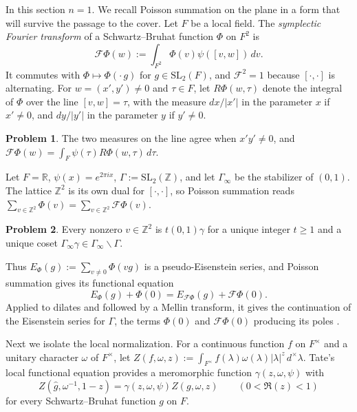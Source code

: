 \documentclass[reqno]{amsart}
\newcommand{\SL}{\mathrm{SL}_2}
\newcommand{\Fc}{\mathcal{F}}
\numberwithin{equation}{section}
\theoremstyle{definition}
\newtheorem{problem}{Problem}[section]
\theoremstyle{plain}
\begin{document}
In this section $n = 1$.  We recall Poisson summation on the plane in a form that will survive the passage to the cover.  Let $F$ be a local field.  The \emph{symplectic Fourier transform} of a Schwartz--Bruhat function $\Phi$ on $F^2$ is
\begin{equation*}
  \Fc \Phi(w) := \int_{F^2} \Phi(v) \psi([v, w]) \, d v.
\end{equation*}
It commutes with $\Phi \mapsto \Phi(\cdot \, g)$ for $g \in \SL(F)$, and $\Fc^2 = 1$ because $[\cdot, \cdot]$ is alternating.  For $w = (x', y') \neq 0$ and $\tau \in F$, let $R \Phi(w, \tau)$ denote the integral of $\Phi$ over the line $[v, w] = \tau$, with the measure $d x / \lvert x' \rvert$ in the parameter $x$ if $x' \neq 0$, and $d y / \lvert y' \rvert$ in the parameter $y$ if $y' \neq 0$.

\begin{problem}\label{pr:lin-lines}
  The two measures on the line agree when $x' y' \neq 0$, and $\Fc \Phi(w) = \int_F \psi(\tau) R \Phi(w, \tau) \, d \tau$.
\end{problem}

Let $F = \mathbb{R}$, $\psi(x) = e^{2 \pi i x}$, $\Gamma := \SL(\mathbb{Z})$, and let $\Gamma_\infty$ be the stabilizer of $(0, 1)$.  The lattice $\mathbb{Z}^2$ is its own dual for $[\cdot, \cdot]$, so Poisson summation reads $\sum_{v \in \mathbb{Z}^2} \Phi(v) = \sum_{v \in \mathbb{Z}^2} \Fc \Phi(v)$.

\begin{problem}\label{pr:lin-eisenstein}
  Every nonzero $v \in \mathbb{Z}^2$ is $t (0, 1) \gamma$ for a unique integer $t \geq 1$ and a unique coset $\Gamma_\infty \gamma \in \Gamma_\infty \backslash \Gamma$.
\end{problem}

Thus $E_\Phi(g) := \sum_{v \neq 0} \Phi(v g)$ is a pseudo-Eisenstein series, and Poisson summation gives its functional equation
\begin{equation}\label{eq:lin-eisenstein}
  E_\Phi(g) + \Phi(0) = E_{\Fc \Phi}(g) + \Fc \Phi(0).
\end{equation}
Applied to dilates and followed by a Mellin transform, it gives the continuation of the Eisenstein series for $\Gamma$, the terms $\Phi(0)$ and $\Fc \Phi(0)$ producing its poles \cite[\S\S3--5]{God}.

Next we isolate the local normalization.  For a continuous function $f$ on $F^\times$ and a unitary character $\omega$ of $F^\times$, let $Z(f, \omega, z) := \int_{F^\times} f(\lambda) \omega(\lambda) \lvert \lambda \rvert^z \, d^\times \lambda$.  Tate's local functional equation \cite[Theorem~2.4.1]{Tate} provides a meromorphic function $\gamma(z, \omega, \psi)$ with
\begin{equation}\label{eq:tate}
  Z(\hat{g}, \omega^{-1}, 1 - z) = \gamma(z, \omega, \psi) Z(g, \omega, z)
  \qquad (0 < \Re(z) < 1)
\end{equation}
for every Schwartz--Bruhat function $g$ on $F$.
\end{document}

